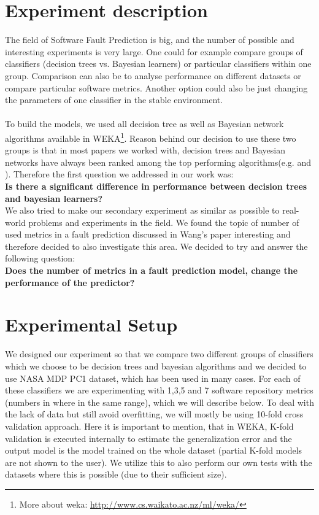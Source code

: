 \section{Experiment description}
The field of Software Fault Prediction is big, and the number of possible and interesting experiments is very large. One could for example compare groups of classifiers (decision trees vs. Bayesian learners) or particular classifiers within one group. Comparison can also be to analyse performance on different datasets or compare particular software metrics. Another option could also be just changing the parameters of one classifier in the stable environment.\\\\
To build the models, we used all decision tree as well as Bayesian network algorithms available in WEKA\footnote{More about weka: \url{http://www.cs.waikato.ac.nz/ml/weka/}}. Reason behind our decision to use these two groups is that in most papers we worked with, decision trees and Bayesian networks have always been ranked among the top performing algorithms(e.g. \cite{malhotra2015systematic} and \cite{shivaji2009reducing}). Therefore the first question we addressed in our work was: \\
\textbf{Is there a significant difference in performance between decision trees and bayesian learners?}\\
We also tried to make our secondary experiment as similar as possible to real-world problems and experiments in the field. We found the topic of number of used metrics in a fault prediction discussed in Wang's paper\cite{wang2011many} interesting and therefore decided to also investigate this area. We decided to try and answer the following question:\\
\textbf{Does the number of metrics in a fault prediction model, change the performance of the predictor?}
\section{Experimental Setup}
We designed our experiment so that we compare two different groups of classifiers which we choose to be decision trees and bayesian algorithms and we decided to use NASA MDP PC1 dataset, which has been used in many cases. For each of these classifiers we are experimenting with 1,3,5 and 7 software repository metrics (numbers in \cite{wang2011many} where in the same range), which we will describe below. To deal with the lack of data but still avoid overfitting, we will mostly be using 10-fold cross validation approach. Here it is important to mention, that in WEKA, K-fold validation is executed internally to estimate the generalization error and the output model is the model trained on the whole dataset (partial K-fold models are not shown to the user). We utilize this to also perform our own tests with the datasets where this is possible (due to their sufficient size).
